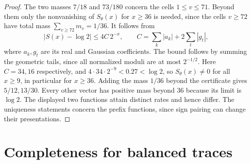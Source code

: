 \documentclass[11pt]{article}
\begin{document}
\begin{proof}
The two masses $7/18$ and $73/180$ concern the cells $1\le v\le71$. Beyond them only the nonvanishing of $S_\theta(x)$ for $x\ge36$ is needed, since the cells $v\ge72$ have total mass $\sum_{v\ge72}m_v=1/36$. It follows from
\[
 |S(x)-\log 2|\le4C\,2^{-x},\qquad
 C=\sum_k|a_k|+2\sum_t|g_t|,
\]
where $a_k,g_t$ are its real and Gaussian coefficients. The bound follows by summing the geometric tails, since all normalized moduli are at most $2^{-1/2}$. Here $C=34,16$ respectively, and $4\cdot34\cdot2^{-9}<0.27<\log2$, so $S_\theta(x)\ne0$ for all $x\ge9$, in particular for $x\ge36$. Adding the mass $1/36$ beyond the certificate gives $5/12,13/30$. Every other vector has positive mass beyond $36$ because its limit is $\log 2$. The displayed two functions attain distinct rates and hence differ. The uniqueness statements concern the prefix functions, since sign pairing can change their presentations.
\end{proof}
\section{Completeness for balanced traces}\label{sec:balanced}
\end{document}

